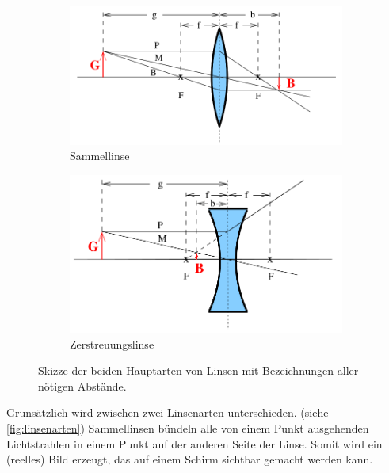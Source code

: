 \begin{figure}
    \centering
    \begin{subfigure}{0.4\textwidth}
        \centering
        \includegraphics[width=\textwidth]{images/skizze_linse_1.png}
        \caption{Sammellinse}
        \label{fig:skizze_linse_1}
    \end{subfigure}    
    \begin{subfigure}{0.4\textwidth}
        \centering
        \includegraphics[width=\textwidth]{images/skizze_linse_2.png}
        \caption{Zerstreuungslinse}
        \label{fig:skizze_linse_2}
    \end{subfigure}    
    \caption{Skizze der beiden Hauptarten von Linsen mit Bezeichnungen aller nötigen Abstände. \cite{V408}}
    \label{fig:linsenarten}
\end{figure}

Grunsätzlich wird zwischen zwei Linsenarten unterschieden. (siehe \autoref{fig:linsenarten})
Sammellinsen bündeln alle von einem Punkt ausgehenden Lichtstrahlen in einem Punkt auf der anderen Seite der Linse.
Somit wird ein (reelles) Bild erzeugt, das auf einem Schirm sichtbar gemacht werden kann.

